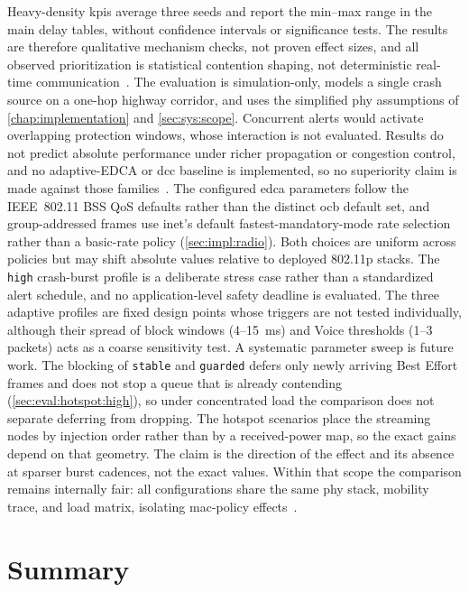 Heavy-density \glspl{kpi} average three seeds and report the min--max range in the main delay tables, without confidence intervals or significance tests.
The results are therefore qualitative mechanism checks, not proven effect sizes, and all observed prioritization is statistical contention shaping, not deterministic real-time communication~\cite{kosekszott2012What}.
The evaluation is simulation-only, models a single crash source on a one-hop highway corridor, and uses the simplified \gls{phy} assumptions of \autoref{chap:implementation} and \autoref{sec:sys:scope}.
Concurrent alerts would activate overlapping protection windows, whose interaction is not evaluated.
Results do not predict absolute performance under richer propagation or congestion control, and no adaptive-EDCA or \gls{dcc} baseline is implemented, so no superiority claim is made against those families~\cite{etsi_dcc_2018}.
The configured \gls{edca} parameters follow the IEEE~802.11 BSS QoS defaults rather than the distinct \gls{ocb} default set, and group-addressed frames use \gls{inet}'s default fastest-mandatory-mode rate selection rather than a basic-rate policy (\autoref{sec:impl:radio}).
Both choices are uniform across policies but may shift absolute values relative to deployed 802.11p stacks.
The \texttt{high} crash-burst profile is a deliberate stress case rather than a standardized alert schedule, and no application-level safety deadline is evaluated.
The three adaptive profiles are fixed design points whose triggers are not tested individually, although their spread of block windows (4--15~ms) and Voice thresholds (1--3 packets) acts as a coarse sensitivity test.
A systematic parameter sweep is future work.
The blocking of \texttt{stable} and \texttt{guarded} defers only newly arriving Best Effort frames and does not stop a queue that is already contending (\autoref{sec:eval:hotspot:high}), so under concentrated load the comparison does not separate deferring from dropping.
The hotspot scenarios place the streaming nodes by injection order rather than by a received-power map, so the exact gains depend on that geometry.
The claim is the direction of the effect and its absence at sparser burst cadences, not the exact values.
Within that scope the comparison remains internally fair: all configurations share the same \gls{phy} stack, mobility trace, and load matrix, isolating \gls{mac}-policy effects~\cite{aguiar2026_veins_qos}.

\section{Summary}
\label{sec:eval:summary}

